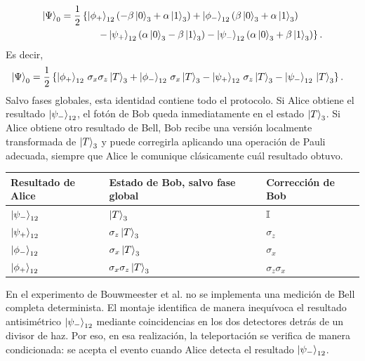 \documentclass[../main.tex]{subfiles}
\begin{document}
\begin{align*}
    \ket{\Psi}_0
    &=
    \frac{1}{2}
    \left\{
        \ket{\phi_+}_{12}
        \left(-\beta\ket{0}_3+\alpha\ket{1}_3\right)
        +
        \ket{\phi_-}_{12}
        \left(\beta\ket{0}_3+\alpha\ket{1}_3\right)
    \right.\\
    &\hspace{1.3cm}
    \left.
        -
        \ket{\psi_+}_{12}
        \left(\alpha\ket{0}_3-\beta\ket{1}_3\right)
        -
        \ket{\psi_-}_{12}
        \left(\alpha\ket{0}_3+\beta\ket{1}_3\right)
    \right\}.
\end{align*}
Es decir,
\begin{align*}
    \ket{\Psi}_0
    &=
    \frac{1}{2}
    \left\{
        \ket{\phi_+}_{12}\,\sigma_x\sigma_z\ket{T}_3
        +
        \ket{\phi_-}_{12}\,\sigma_x\ket{T}_3
        -
        \ket{\psi_+}_{12}\,\sigma_z\ket{T}_3
        -
        \ket{\psi_-}_{12}\,\ket{T}_3
    \right\}.
\end{align*}
Salvo fases globales, esta identidad contiene todo el protocolo. Si Alice obtiene el resultado $\ket{\psi_-}_{12}$, el fotón de Bob queda inmediatamente en el estado $\ket{T}_3$. Si Alice obtiene otro resultado de Bell, Bob recibe una versión localmente transformada de $\ket{T}_3$ y puede corregirla aplicando una operación de Pauli adecuada, siempre que Alice le comunique clásicamente cuál resultado obtuvo.

\begin{center}
\renewcommand{\arraystretch}{1.25}
\begin{tabular}{>{\centering\arraybackslash}p{} >{\centering\arraybackslash}p{} >{\centering\arraybackslash}p{}}
\toprule
\textbf{Resultado de Alice} & \textbf{Estado de Bob, salvo fase global} & \textbf{Corrección de Bob} \\
\midrule
$\ket{\psi_-}_{12}$ & $\ket{T}_3$ & $\mathbb{I}$ \\
$\ket{\psi_+}_{12}$ & $\sigma_z\ket{T}_3$ & $\sigma_z$ \\
$\ket{\phi_-}_{12}$ & $\sigma_x\ket{T}_3$ & $\sigma_x$ \\
$\ket{\phi_+}_{12}$ & $\sigma_x\sigma_z\ket{T}_3$ & $\sigma_z\sigma_x$ \\
\bottomrule
\end{tabular}
\end{center}

\begin{observacion}
En el experimento de Bouwmeester et al. no se implementa una medición de Bell completa determinista. El montaje identifica de manera inequívoca el resultado antisimétrico $\ket{\psi_-}_{12}$ mediante coincidencias en los dos detectores detrás de un divisor de haz. Por eso, en esa realización, la teleportación se verifica de manera condicionada: se acepta el evento cuando Alice detecta el resultado $\ket{\psi_-}_{12}$.
\end{observacion}
\end{document}
